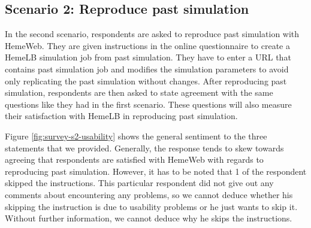 \subsection{Scenario 2: Reproduce past simulation}

In the second scenario, respondents are asked to reproduce past simulation with HemeWeb. They are given instructions in the online questionnaire to create a HemeLB simulation job from past simulation. They have to enter a URL that contains past simulation job and modifies the simulation parameters to avoid only replicating the past simulation without changes. After reproducing past simulation, respondents are then asked to state agreement with the same questions like they had in the first scenario. These questions will also measure their satisfaction with HemeLB in reproducing past simulation.


\vspace{0.5cm}

\noindent%
\begin{minipage}{\linewidth}%
 \label{fig:survey-s2-usability}%
\end{minipage}
\vspace{0.5cm}

Figure \ref{fig:survey-s2-usability} shows the general sentiment to the three statements that we provided. Generally, the response tends to skew towards agreeing that respondents are satisfied with HemeWeb with regards to reproducing past simulation. However, it has to be noted that 1 of the respondent skipped the instructions. This particular respondent did not give out any comments about encountering any problems, so we cannot deduce whether his skipping the instruction is due to usability problems or he just wants to skip it. Without further information, we cannot deduce why he skips the instructions.

